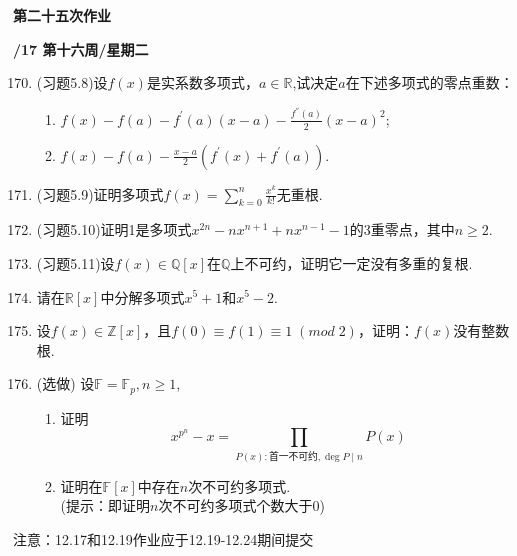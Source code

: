 \documentclass[a4paper,12pt]{article}
\begin{document}
\newpage
\head

\begin{center} %
	{\Large \bf 第二十五次作业} %
	\vspace{2mm}
	
	{\bf{}/17 \quad  第十六周/星期二} %
\end{center} 

\begin{enumerate}\setcounter{enumi}{169}

\item (习题5.8)设$f(x)$是实系数多项式，$a\in \mathbb{R}$,试决定$a$在下述多项式的零点重数：
\begin{enumerate}
    \item $f(x)-f(a)-f^{'}(a)(x-a)-\frac{f^{''}(a)}2(x-a)^2$;
    \item $f(x)-f(a)-\frac{x-a}2(f^{'}(x)+f^{'}(a))$.
\end{enumerate}

\item (习题5.9)证明多项式$f(x)=\sum^n_{k=0}\frac{x^k}{k!}$无重根.

\item (习题5.10)证明1是多项式$x^{2n}-nx^{n+1}+nx^{n-1}-1$的3重零点，其中$n\ge 2$.

\item (习题5.11)设$f(x)\in\mathbb{Q}[x]$在$\mathbb{Q}$上不可约，证明它一定没有多重的复根.

\item 请在$\mathbb{R}[x]$中分解多项式$x^5+1$和$x^5-2$.

\item 设$f(x)\in \mathbb{Z}[x]$，且$f(0)\equiv f(1)\equiv 1\;(mod \;2)$，证明：$f(x)$没有整数根.

\item ({\color{red}选做}) 设$\mathbb{F}=\mathbb{F}_p,n\ge 1$,
\begin{enumerate}
    \item 证明$$x^{p^{n}}-x=\prod_{P(x):\text{首一不可约},\deg P\mid n}P(x)$$
    \item 证明在$\mathbb{F}[x]$中存在$n$次不可约多项式.\\({\color{blue}提示：即证明$n$次不可约多项式个数大于0})
\end{enumerate}

\end{enumerate}
{\color{red} 注意：12.17和12.19作业应于12.19-12.24期间提交}
\end{document}
